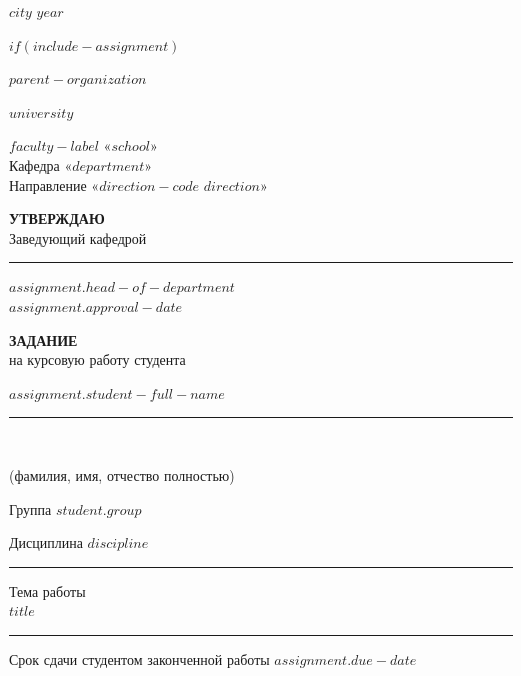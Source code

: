 \documentclass[a4paper,14pt]{extarticle}
\newcommand{\SUSUSignLine}[1]{\rule{30mm}{0.4pt}\hspace{0.5em}#1}
\begin{document}
\vfill
\begin{center}
$city$ $year$
\end{center}
\clearpage

$if(include-assignment)$
\thispagestyle{empty}
\begin{center}
$parent-organization$

\vspace{0.25\baselineskip}
$university$

\vspace{0.25\baselineskip}
$faculty-label$ «$school$»\\
Кафедра «$department$»\\
Направление «$direction-code$ $direction$»
\end{center}

\begin{flushright}
\begin{minipage}{0.48\textwidth}
\textbf{УТВЕРЖДАЮ}\\
Заведующий кафедрой\\
\SUSUSignLine{$assignment.head-of-department$}\\
\mbox{$assignment.approval-date$}
\end{minipage}
\end{flushright}

\begin{center}
\textbf{ЗАДАНИЕ}\\
на курсовую работу студента
\end{center}

\noindent $assignment.student-full-name$\\
\rule{\linewidth}{0.4pt}\\[-0.45\baselineskip]
\begin{center}\small (фамилия, имя, отчество полностью)\end{center}
\noindent Группа $student.group$

\vspace{0.5\baselineskip}
 Дисциплина $discipline$\\
\rule{\linewidth}{0.4pt}

\vspace{0.5\baselineskip}
 Тема работы\\
$title$\\
\rule{\linewidth}{0.4pt}

\vspace{0.5\baselineskip}
 Срок сдачи студентом законченной работы \mbox{$assignment.due-date$}
\end{document}
